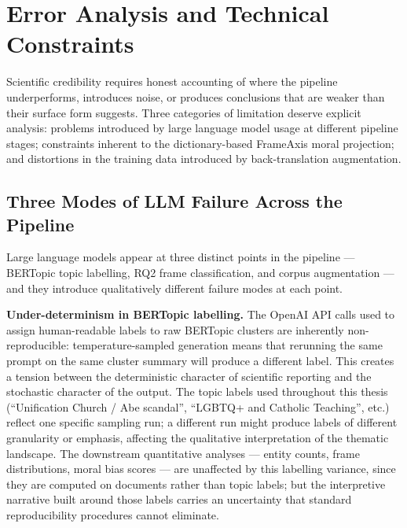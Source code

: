 \documentclass[../CLthesis.tex]{subfiles}
\begin{document}
\section{Error Analysis and Technical Constraints}
\label{sec:discussion-errors}

Scientific credibility requires honest accounting of where the pipeline underperforms, introduces noise, or produces conclusions that are weaker than their surface form suggests. Three categories of limitation deserve explicit analysis: problems introduced by large language model usage at different pipeline stages; constraints inherent to the dictionary-based FrameAxis moral projection; and distortions in the training data introduced by back-translation augmentation.

\subsection{Three Modes of LLM Failure Across the Pipeline}

Large language models appear at three distinct points in the pipeline --- BERTopic topic labelling, RQ2 frame classification, and corpus augmentation --- and they introduce qualitatively different failure modes at each point.

\textbf{Under-determinism in BERTopic labelling.} The OpenAI API calls used to assign human-readable labels to raw BERTopic clusters are inherently non-reproducible: temperature-sampled generation means that rerunning the same prompt on the same cluster summary will produce a different label. This creates a tension between the deterministic character of scientific reporting and the stochastic character of the output. The topic labels used throughout this thesis (``Unification Church / Abe scandal'', ``LGBTQ+ and Catholic Teaching'', etc.) reflect one specific sampling run; a different run might produce labels of different granularity or emphasis, affecting the qualitative interpretation of the thematic landscape. The downstream quantitative analyses --- entity counts, frame distributions, moral bias scores --- are unaffected by this labelling variance, since they are computed on documents rather than topic labels; but the interpretive narrative built around those labels carries an uncertainty that standard reproducibility procedures cannot eliminate.
\end{document}
